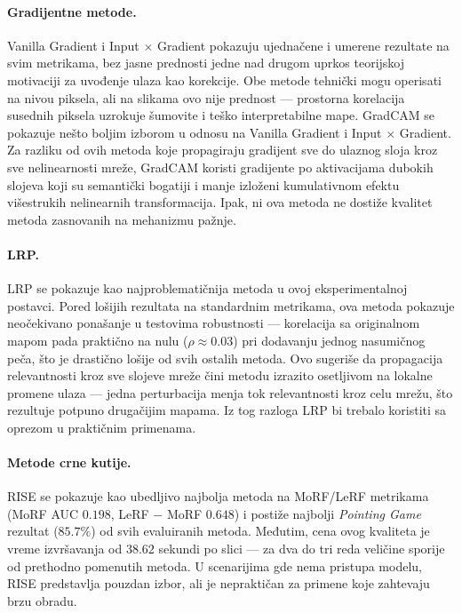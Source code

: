 \paragraph{Gradijentne metode.}
Vanilla Gradient i Input $\times$ Gradient pokazuju ujednačene i umerene 
rezultate na svim metrikama, bez jasne prednosti jedne nad drugom uprkos 
teorijskoj motivaciji za uvođenje ulaza kao korekcije. Obe metode tehnički 
mogu operisati na nivou piksela, ali na slikama ovo nije prednost — 
prostorna korelacija susednih piksela uzrokuje šumovite i teško 
interpretabilne mape. GradCAM se pokazuje nešto boljim izborom u odnosu na Vanilla Gradient 
i Input $\times$ Gradient. Za razliku od ovih metoda koje propagiraju 
gradijent sve do ulaznog sloja kroz sve nelinearnosti mreže, GradCAM 
koristi gradijente po aktivacijama dubokih slojeva koji su semantički 
bogatiji i manje izloženi kumulativnom efektu višestrukih nelinearnih 
transformacija. Ipak, ni ova metoda ne dostiže kvalitet metoda zasnovanih na mehanizmu pažnje.

\paragraph{LRP.}
LRP se pokazuje kao najproblematičnija metoda u ovoj eksperimentalnoj postavci. 
Pored lošijih rezultata na standardnim metrikama, ova metoda pokazuje 
neočekivano ponašanje u testovima robustnosti — korelacija sa originalnom 
mapom pada praktično na nulu ($\rho \approx 0.03$) pri dodavanju jednog 
nasumičnog peča, što je drastično lošije od svih ostalih metoda. Ovo 
sugeriše da propagacija relevantnosti kroz sve slojeve mreže čini metodu 
izrazito osetljivom na lokalne promene ulaza — jedna perturbacija menja 
tok relevantnosti kroz celu mrežu, što rezultuje potpuno drugačijim mapama. 
Iz tog razloga LRP bi trebalo koristiti sa oprezom u praktičnim primenama.

\paragraph{Metode crne kutije.}
RISE se pokazuje kao ubedljivo najbolja metoda na MoRF/LeRF metrikama (MoRF AUC $0.198$, LeRF $-$ MoRF $0.648$) i postiže najbolji \textit{Pointing Game} rezultat ($85.7\%$) od svih evaluiranih metoda. Međutim, cena ovog kvaliteta je 
vreme izvršavanja od $38.62$ sekundi po slici — za dva do tri reda 
veličine sporije od prethodno pomenutih metoda. U scenarijima gde nema pristupa modelu, RISE predstavlja pouzdan izbor, ali je nepraktičan za primene koje zahtevaju brzu obradu.

